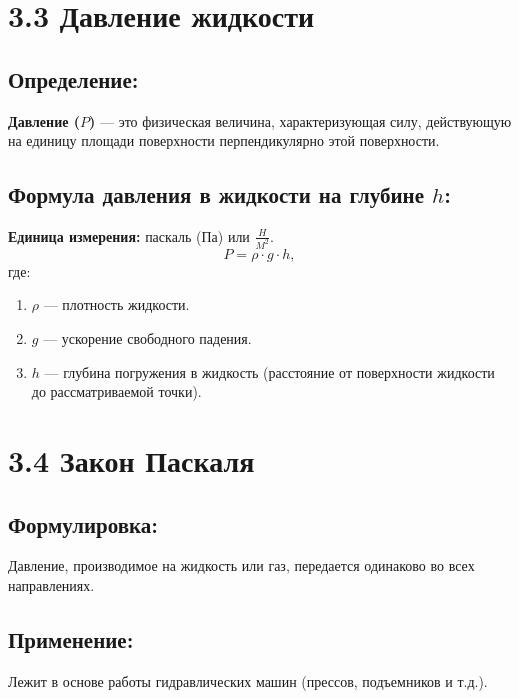 \documentclass[a4paper,12pt]{article}
\begin{document}
\section*{3.3 Давление жидкости}
\vspace{-9pt}
\subsection*{Определение:}
\vspace{-3pt}
\textbf{Давление ($P$)} — это физическая величина, характеризующая силу, действующую на единицу площади поверхности перпендикулярно этой поверхности.

\vspace{-9pt}
\subsection*{Формула давления в жидкости на глубине $h$:}
\vspace{-3pt}
\textbf{Единица измерения:} паскаль (Па) или $\frac{H}{M^2}$.
\vspace{-0.05em}
$$ P = \rho \cdot g \cdot h, $$
где:
\begin{enumerate}[itemsep=0pt, topsep=0pt, parsep=2pt]
  \item $\rho$ — плотность жидкости.
  \item $g$ — ускорение свободного падения.
  \item $h$ — глубина погружения в жидкость (расстояние от поверхности жидкости до рассматриваемой точки).
\end{enumerate}



\section*{3.4 Закон Паскаля}
\vspace{-9pt}
\subsection*{Формулировка:}
\vspace{-3pt}
Давление, производимое на жидкость или газ, передается одинаково во всех направлениях.

\vspace{-9pt}
\subsection*{Применение:}
\vspace{-3pt}
Лежит в основе работы гидравлических машин (прессов, подъемников и т.д.).
\end{document}
